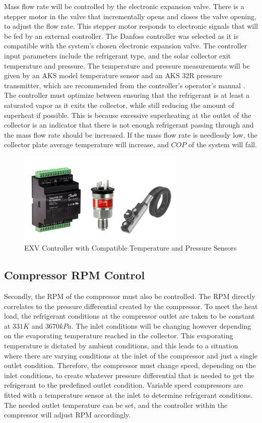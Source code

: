 \medskip
Mass flow rate will be controlled by the electronic expansion valve. There is a stepper motor in the valve that incrementally opens and closes the valve opening, to adjust the flow rate. This stepper motor responds to electronic signals that will be fed by an external controller. The Danfoss controller \cite{controller} was selected as it is compatible with the system’s chosen electronic expansion valve. The controller input parameters include the refrigerant type, and the solar collector exit temperature and pressure. The temperature and pressure measurements will be given by an AKS model temperature sensor and an AKS 32R pressure transmitter, which are recommended from the controller’s operator’s manual \cite{controller}. The controller must optimize between ensuring that the refrigerant is at least a saturated vapor as it exits the collector, while still reducing the amount of superheat if possible. This is because excessive superheating at the outlet of the collector is an indicator that there is not enough refrigerant passing through and the mass flow rate should be increased. If the mass flow rate is needlessly low, the collector plate average temperature will increase, and $COP$ of the system will fall.

\begin{figure}[H]
    \centering
    \includegraphics[width=8cm]{images/control_sensors.png}
    \caption{EXV Controller with Compatible Temperature and Pressure Sensors}
\end{figure}

\subsection{Compressor RPM Control}

Secondly, the RPM of the compressor must also be controlled. The RPM directly correlates to the pressure differential created by the compressor. To meet the heat load, the refrigerant conditions at the compressor outlet are taken to be constant at $331K$ and $3670 kPa$. The inlet conditions will be changing however depending on the evaporating temperature reached in the collector. This evaporating temperature is dictated by ambient conditions, and this leads to a situation where there are varying conditions at the inlet of the compressor and just a single outlet condition. Therefore, the compressor must change speed, depending on the inlet conditions, to create whatever pressure differential that is needed to get the refrigerant to the predefined outlet condition. Variable speed compressors are fitted with a temperature sensor at the inlet to determine refrigerant conditions. The needed outlet temperature can be set, and the controller within the compressor will adjust RPM accordingly.
